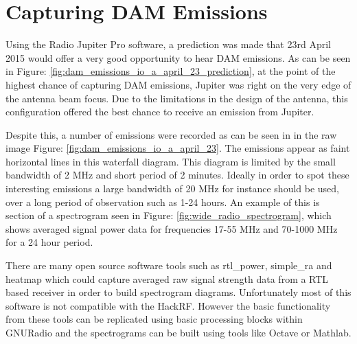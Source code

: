 \documentclass[runningheads,a4paper]{llncs}
\begin{document}
\newpage
\section*{Capturing DAM Emissions}
Using the Radio Jupiter Pro software, a prediction was made that 23rd April 2015 would offer a very good opportunity to hear \gls{DAM} emissions. As can be seen in Figure: \ref{fig:dam_emissions_io_a_april_23_prediction}, at the point of the highest chance of capturing \gls{DAM} emissions, Jupiter was right on the very edge of the antenna beam focus. Due to the limitations in the design of the antenna, this configuration offered the best chance to receive an emission from Jupiter.

Despite this, a number of emissions were recorded as can be seen in in the raw image Figure: \ref{fig:dam_emissions_io_a_april_23}. The emissions appear as faint horizontal lines in this waterfall diagram. This diagram is limited by the small bandwidth of 2 MHz and short period of 2 minutes. Ideally in order to spot these interesting emissions a large bandwidth of 20 MHz for instance should be used, over a long period of observation such as 1-24 hours. An example of this is section of a spectrogram seen in Figure: \ref{fig:wide_radio_spectrogram}, which shows averaged signal power data for frequencies 17-55 MHz and 70-1000 MHz for a 24 hour period.


There are many open source software tools such as rtl\_power, simple\_ra and heatmap which could capture averaged raw signal strength data from a RTL based receiver in order to build spectrogram diagrams. Unfortunately most of this software is not compatible with the HackRF. However the basic functionality from these tools can be replicated using basic processing blocks within GNURadio and the spectrograms can be built using tools like Octave or Mathlab.
\end{document}

